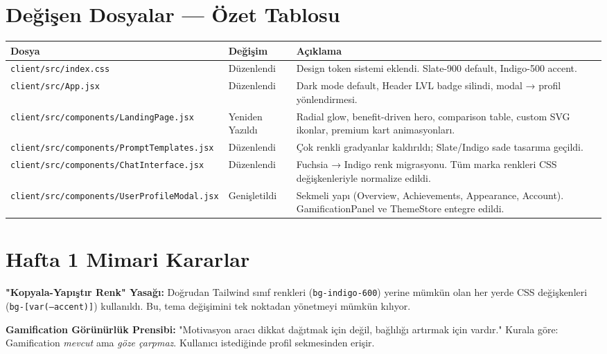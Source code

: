 \documentclass[12pt,a4paper]{article}
\begin{document}
\section{Değişen Dosyalar — Özet Tablosu}

\begin{longtable}{p{5cm}p{2.5cm}p{6cm}}
\toprule
\textbf{Dosya} & \textbf{Değişim} & \textbf{Açıklama} \\
\midrule
\texttt{client/src/index.css} & Düzenlendi & Design token sistemi eklendi. Slate-900 default, Indigo-500 accent. \\
\texttt{client/src/App.jsx} & Düzenlendi & Dark mode default, Header LVL badge silindi, modal → profil yönlendirmesi. \\
\texttt{client/src/components/LandingPage.jsx} & Yeniden Yazıldı & Radial glow, benefit-driven hero, comparison table, custom SVG ikonlar, premium kart animasyonları. \\
\texttt{client/src/components/PromptTemplates.jsx} & Düzenlendi & Çok renkli gradyanlar kaldırıldı; Slate/Indigo sade tasarıma geçildi. \\
\texttt{client/src/components/ChatInterface.jsx} & Düzenlendi & Fuchsia → Indigo renk migrasyonu. Tüm marka renkleri CSS değişkenleriyle normalize edildi. \\
\texttt{client/src/components/UserProfileModal.jsx} & Genişletildi & Sekmeli yapı (Overview, Achievements, Appearance, Account). GamificationPanel ve ThemeStore entegre edildi. \\
\bottomrule
\end{longtable}

\section{Hafta 1 Mimari Kararlar}

\begin{keypoint}
\textbf{"Kopyala-Yapıştır Renk" Yasağı:} Doğrudan Tailwind sınıf renkleri (\texttt{bg-indigo-600}) yerine mümkün olan her yerde CSS değişkenleri (\texttt{bg-[var(--accent)]}) kullanıldı. Bu, tema değişimini tek noktadan yönetmeyi mümkün kılıyor.
\end{keypoint}

\begin{keypoint}
\textbf{Gamification Görünürlük Prensibi:} "Motivasyon aracı dikkat dağıtmak için değil, bağlılığı artırmak için vardır." Kurala göre: Gamification \textit{mevcut} ama \textit{göze çarpmaz}. Kullanıcı istediğinde profil sekmesinden erişir.
\end{keypoint}
\end{document}
